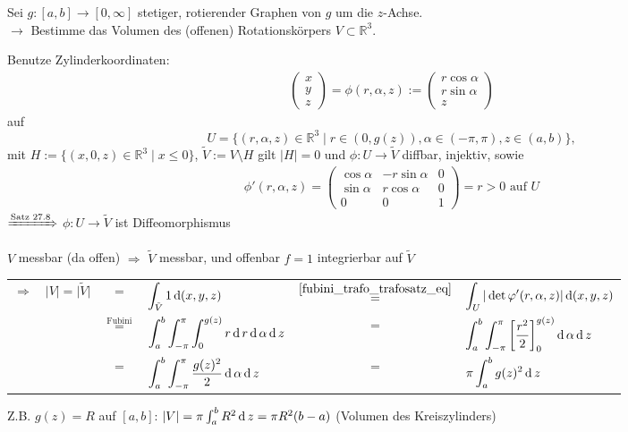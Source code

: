 \begin{example}
	Sei $g:[a,b]\to[0,\infty]$ stetiger, rotierender Graphen von $g$ um die $z$-Achse. \\
	$\rightarrow$ Bestimme das Volumen des (offenen) Rotationskörpers $V\subset\mathbb{R}^3$.
	
	Benutze Zylinderkoordinaten:\begin{align*}
		\begin{pmatrix}
			x \\ y \\ z
		\end{pmatrix} = \phi(r,\alpha, z) := \begin{pmatrix}
			r\cos \alpha \\ r \sin\alpha \\ z
		\end{pmatrix}
	\end{align*}
	auf \[U= \{ (r,\alpha,z) \in\mathbb{R}^3 \mid r \in (0, g(z)), \alpha\in (-\pi,\pi),z\in(a,b) \},\] mit $H:= \{ (x,0,z) \in\mathbb{R}^3 \mid x \le 0 \}$, $\tilde{V} := V \setminus H $ gilt $\vert H \vert = 0$ und $\phi:U\to\tilde{V}$ \gls{diffbar}, injektiv, sowie \begin{align*}
		\phi'(r,\alpha,z) = \begin{pmatrix}
			\cos \alpha & - r\sin \alpha & 0 \\ \sin \alpha & r \cos \alpha & 0 \\ 0 & 0 & 1
		\end{pmatrix} = r > 0\text{ auf $U$}
	\end{align*}
	$\xRightarrow{\text{Satz 27.8}}$ $\phi:U\to\tilde{V}$ ist Diffeomorphismus
	
	$V$ messbar (da offen) $\Rightarrow$ $\tilde{V}$ messbar, und offenbar $f=1$ integrierbar auf $\tilde{V}$ \\
	\renewcommand{\arraystretch}{3}
	\begin{tabularx}{\linewidth}{r@{\ \ }r@{\ }c@{\ }l@{\ }c@{\ }X}
		$\Rightarrow$ & $\vert V \vert = \vert \tilde{V} \vert$ &=& $\displaystyle\int_{\tilde{V}} 1 \operatorname{d} (x,y,z)$ &$ \overset{\eqref{fubini_trafo_trafosatz_eq}}{=}$ &  $\displaystyle\int_U \vert \det \varphi'(r,\alpha,z)\vert \operatorname{d} (x,y,z)$ \\
		& & $\overset{\text{Fubini}}{=}$ &  $\displaystyle \int_a^b \int_{-\pi}^\pi \int_0^{g(z)} r \operatorname{d} r \operatorname{d} \alpha \operatorname{d} z$ &=& $\displaystyle\int_a^b \int_{-\pi}^\pi \left[ \frac{r^2}{2} \right]_0^{g(z)} \operatorname{d} \alpha \operatorname{d} z$ \\
		& & =  & $\displaystyle\int_a^b \int_{-\pi}^\pi \frac{g(z)^2}{2} \operatorname{d} \alpha \operatorname{d} z$ &=& $\displaystyle\pi \int_a^b g(z)^2\operatorname{d} z$
	\end{tabularx}
	
	
	Z.B. $g(z) = R$ auf $[a,b]$: $\vert V \vert = \pi \int_a^b R^2 \operatorname{d} z = \pi R^2(b - a)$ (Volumen des Kreiszylinders)
\end{example}